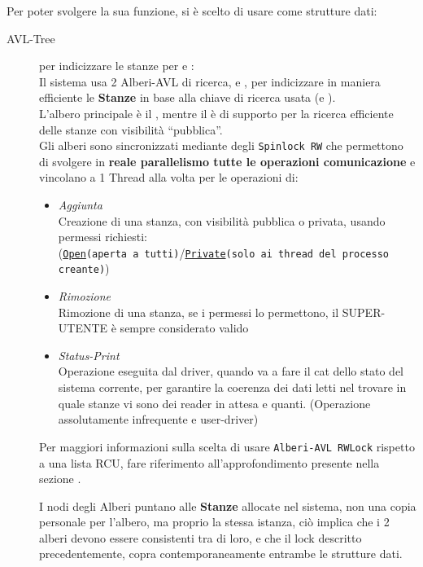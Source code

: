Per poter svolgere la sua funzione, si è scelto di usare come strutture dati:
\begin{description}
\item[AVL-Tree] per indicizzare le stanze per \tagSys e \keySys:\\
    Il sistema usa 2 Alberi-AVL di ricerca, \tagTree e \keyTree, per indicizzare in maniera efficiente le
    \textbf{Stanze} in base alla chiave di ricerca usata (\tagSys e \keySys). \\
    L'albero principale è il \tagTree, mentre il \keyTree è di supporto per la ricerca efficiente delle
    stanze con visibilità ``pubblica''.\\
    Gli alberi sono sincronizzati mediante degli \texttt{Spinlock RW} che permettono di svolgere in \textbf{reale
    parallelismo tutte le operazioni comunicazione} e vincolano a 1 Thread alla volta per le operazioni di:
    \begin{itemize}
    \item \textit{Aggiunta} \\
        Creazione di una stanza, con visibilità pubblica o privata, usando permessi richiesti:\\
        (\texttt{\underline{Open}(aperta a tutti)}/\texttt{\underline{Private}(solo ai thread del processo creante)})
    \item \textit{Rimozione} \\
        Rimozione di una stanza, se i permessi lo permettono, il SUPER-UTENTE è sempre considerato valido
    \item \textit{Status-Print} \\
        Operazione eseguita dal driver, quando va a fare il cat dello stato del sistema corrente, per garantire la
        coerenza dei dati letti nel trovare in quale stanze vi sono dei reader in attesa e quanti. (Operazione
        assolutamente infrequente e user-driver)
\end{itemize}

\begin{footnotesize}
Per maggiori informazioni sulla scelta di usare \texttt{Alberi-AVL RWLock} rispetto a una lista
RCU, fare riferimento all'approfondimento presente nella sezione .
\end{footnotesize}

I nodi degli Alberi puntano alle \textbf{Stanze} allocate nel sistema, non una copia personale per l'albero, ma
proprio la stessa istanza, ciò implica che i 2 alberi devono essere consistenti tra di loro, e che il lock
descritto precedentemente, copra contemporaneamente entrambe le strutture dati.


\end{description}
